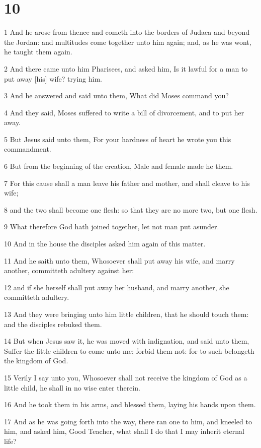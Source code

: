 \chapter{10}

\par 1 And he arose from thence and cometh into the borders of Judaea and beyond the Jordan: and multitudes come together unto him again; and, as he was wont, he taught them again.
\par 2 And there came unto him Pharisees, and asked him, Is it lawful for a man to put away [his] wife? trying him.
\par 3 And he answered and said unto them, What did Moses command you?
\par 4 And they said, Moses suffered to write a bill of divorcement, and to put her away.
\par 5 But Jesus said unto them, For your hardness of heart he wrote you this commandment.
\par 6 But from the beginning of the creation, Male and female made he them.
\par 7 For this cause shall a man leave his father and mother, and shall cleave to his wife;
\par 8 and the two shall become one flesh: so that they are no more two, but one flesh.
\par 9 What therefore God hath joined together, let not man put asunder.
\par 10 And in the house the disciples asked him again of this matter.
\par 11 And he saith unto them, Whosoever shall put away his wife, and marry another, committeth adultery against her:
\par 12 and if she herself shall put away her husband, and marry another, she committeth adultery.
\par 13 And they were bringing unto him little children, that he should touch them: and the disciples rebuked them.
\par 14 But when Jesus saw it, he was moved with indignation, and said unto them, Suffer the little children to come unto me; forbid them not: for to such belongeth the kingdom of God.
\par 15 Verily I say unto you, Whosoever shall not receive the kingdom of God as a little child, he shall in no wise enter therein.
\par 16 And he took them in his arms, and blessed them, laying his hands upon them.
\par 17 And as he was going forth into the way, there ran one to him, and kneeled to him, and asked him, Good Teacher, what shall I do that I may inherit eternal life?
